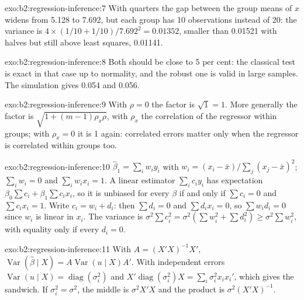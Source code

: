 \begin{solution}{exo:b2:regression-inference:7}
With quarters the gap between the group means of $x$ widens from 5.128 to 7.692, but each group has 10 observations
instead of 20: the variance is $4 \times (1/10 + 1/10)/7.692^2 = 0.01352$, smaller than 0.01521 with halves but still
above least squares, 0.01141.
\end{solution}

\begin{solution}{exo:b2:regression-inference:8}
Both should be close to 5 per cent: the classical test is exact in that case up to normality, and the robust one is
valid in large samples. The simulation gives 0.054 and 0.056.
\end{solution}

\begin{solution}{exo:b2:regression-inference:9}
With $\rho = 0$ the factor is $\sqrt{1} = 1$. More generally the factor is $\sqrt{1 + (m - 1)\rho_x\rho}$, with $\rho_x$
the correlation of the regressor within groups; with $\rho_x = 0$ it is 1 again: correlated errors matter only when the
regressor is correlated within groups too.
\end{solution}

\begin{solution}{exo:b2:regression-inference:10}
$\hat\beta_1 = \sum_iw_iy_i$ with $w_i = (x_i - \bar x)/\sum_j(x_j - \bar x)^2$; $\sum_iw_i = 0$ and $\sum_iw_ix_i = 1$.
A linear estimator $\sum_ic_iy_i$ has expectation $\beta_0\sum c_i + \beta_1\sum c_ix_i$, so it is unbiased for every
$\beta$ if and only if $\sum c_i = 0$ and $\sum c_ix_i = 1$. Write $c_i = w_i + d_i$: then $\sum d_i = 0$ and $\sum
d_ix_i = 0$, so $\sum w_id_i = 0$ since $w_i$ is linear in $x_i$. The variance is $\sigma^2\sum c_i^2 = \sigma^2(\sum
w_i^2 + \sum d_i^2) \geq \sigma^2\sum w_i^2$, with equality only if every $d_i = 0$.
\end{solution}

\begin{solution}{exo:b2:regression-inference:11}
With $A = (X'X)^{-1}X'$, $\operatorname{Var}(\hat\beta \mid X) = A\operatorname{Var}(u \mid X)A'$. With independent
errors $\operatorname{Var}(u \mid X) = \operatorname{diag}(\sigma_i^2)$ and $X'\operatorname{diag}(\sigma_i^2)X =
\sum_i\sigma_i^2x_ix_i'$, which gives the sandwich. If $\sigma_i^2 = \sigma^2$, the middle is $\sigma^2X'X$ and the
product is $\sigma^2(X'X)^{-1}$.
\end{solution}

